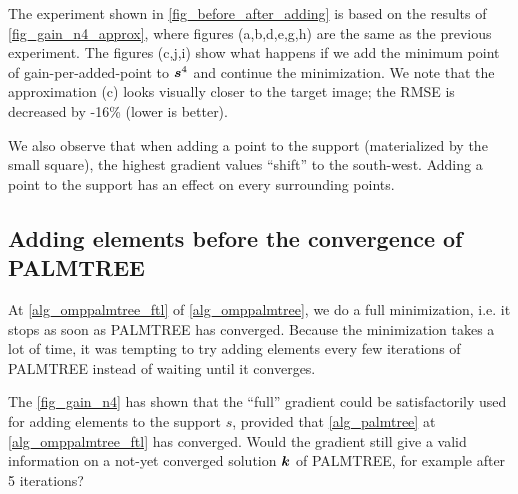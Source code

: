 The experiment shown in \cref{fig_before_after_adding} is based on the results of \cref{fig_gain_n4_approx}, where figures (a,b,d,e,g,h) are the same as the previous experiment. The figures (c,j,i) show what  happens if we add the minimum point of gain-per-added-point to $\bm{s}^4$ and continue the minimization. We note that the approximation (c) looks visually closer to the target image; the RMSE is decreased by -16\% (lower is better).

We also observe that when adding a point to the support (materialized by the  small square), the highest gradient values “shift” to the south-west. Adding a point to the support has an effect on every surrounding points.

\subsection{Adding elements before the convergence of \ac{PALMTREE}} \label{sec_add_before_converged}

At \cref{alg_omppalmtree_ftl} of \cref{alg_omppalmtree}, we do a full minimization, i.e. it stops as soon as \ac{PALMTREE} has converged. Because the minimization takes a lot of time, it was tempting to try adding elements every few iterations of \ac{PALMTREE} instead of waiting until it converges.

The \cref{fig_gain_n4} has shown that the “full” gradient could be satisfactorily used for adding elements to the support $s$, provided that \cref{alg_palmtree} at \cref{alg_omppalmtree_ftl} has converged. Would the gradient still give a valid information on a not-yet converged solution $\bm{k}$ of \ac{PALMTREE}, for example after 5 iterations?

